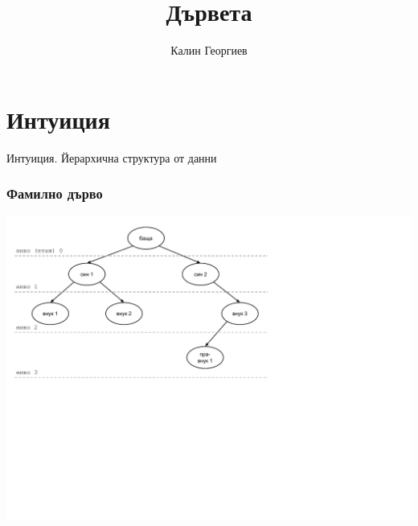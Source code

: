 \documentclass{beamer}
\begin{document}
\title[Структури от данни и програмиране]{Дървета} 
\author{Калин Георгиев} 
\frame{\titlepage} 

\section{Интуиция} 


\begin{frame}
\centerline{Интуиция. Йерархична структура от данни}
\end{frame}


\begin{frame}[fragile]
\frametitle{Фамилно дърво}

\includegraphics[width=17cm]{images/tree_family_tree}

\end{frame}
\end{document}
